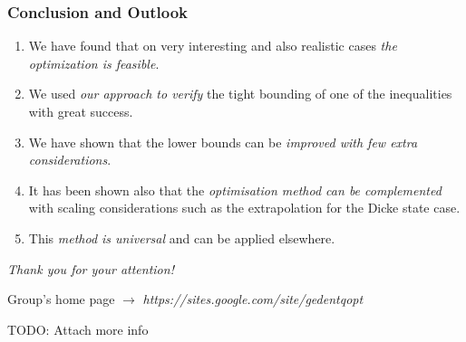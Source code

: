 \documentclass{beamer}
\begin{document}
	\begin{frame}
		\frametitle{Conclusion and Outlook}
		\begin{enumerate}
			\item<1-> We have found that on very interesting and also realistic cases \emph{\color{blue}the optimization is feasible}.
			\item<2-> We used \emph{\color{blue}our approach to verify} the tight bounding of one of the inequalities with great success.
			\item<3-> We have shown that the lower bounds can be \emph{\color{blue}improved with few extra considerations}.
			\item<4-> It has been shown also that the \emph{\color{blue}optimisation method can be complemented} with scaling considerations such as the extrapolation for the Dicke state case.
			\item<5-> This \emph{\color{blue}method is universal} and can be applied elsewhere.
		\end{enumerate}

	\end{frame}

	\begin{frame}
		\emph{\Large Thank you for your attention!}

		\vspace{5px}
		Group's home page $\rightarrow$ \emph{\color{blue} https://sites.google.com/site/gedentqopt}

		TODO: Attach more info

	\end{frame}
\end{document}
